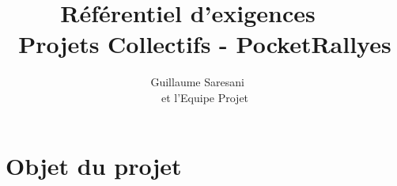 \documentclass[a4paper,14pt]{article}
\title{Référentiel d'exigences ~~\\ Projets Collectifs - PocketRallyes}
\author{Guillaume Saresani ~~\\ et l'Equipe Projet}
\begin{document}
\maketitle
\begin{center}
\end{center}
\newpage
\tableofcontents
\newpage
\section{Objet du projet}

\newpage
%
%
%
%
\end{document}
